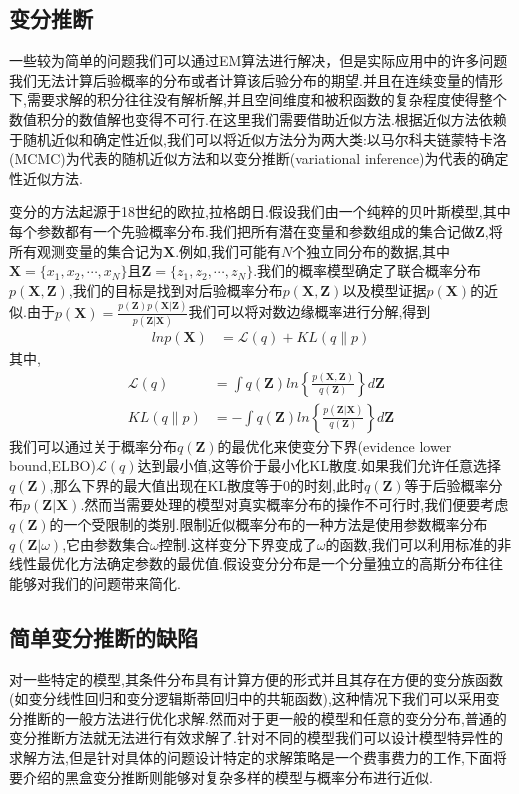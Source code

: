 \documentclass{ctexart}
\begin{document}
\subsection{变分推断}
一些较为简单的问题我们可以通过EM算法进行解决，但是实际应用中的许多问题我们无法计算后验概率的分布或者计算该后验分布的期望.并且在连续变量的情形下,需要求解的积分往往没有解析解,并且空间维度和被积函数的复杂程度使得整个数值积分的数值解也变得不可行.在这里我们需要借助近似方法.根据近似方法依赖于随机近似和确定性近似,我们可以将近似方法分为两大类:以马尔科夫链蒙特卡洛(MCMC)为代表的随机近似方法和以变分推断(variational inference)为代表的确定性近似方法.


变分的方法起源于18世纪的欧拉,拉格朗日.假设我们由一个纯粹的贝叶斯模型,其中每个参数都有一个先验概率分布.我们把所有潜在变量和参数组成的集合记做$\mathbf{Z}$,将所有观测变量的集合记为$\mathbf{X}$.例如,我们可能有$N$个独立同分布的数据,其中$\mathbf{X}=\{x_1,x_2,\cdots,x_N\}$且$\mathbf{Z}=\{z_1,z_2,\cdots,z_N\}$.我们的概率模型确定了联合概率分布$p(\mathbf{X,Z})$,我们的目标是找到对后验概率分布$p(\mathbf{X,Z})$以及模型证据$p(\mathbf{X})$的近似.由于$p(\mathbf{X}) = \frac{p(\mathbf{Z})p(\mathbf{X|Z})}{p(\mathbf{Z|X})}$我们可以将对数边缘概率进行分解,得到
\begin{align*}
lnp(\mathbf{X}) &=\mathcal{L}(q)+KL(q\|p)
\end{align*}
其中,
\begin{align*}
\mathcal{L}(q) &= \int q(\mathbf{Z})ln\left\{\frac{p(\mathbf{X,Z})}{q(\mathbf{Z})}\right\}d\mathbf{Z}\\
KL(q\|p) &= -\int q(\mathbf{Z})ln\left\{\frac{p(\mathbf{Z|X})}{q(\mathbf{Z})}\right\}d\mathbf{Z}
\end{align*}
我们可以通过关于概率分布$q(\mathbf{Z})$的最优化来使变分下界(evidence lower bound,ELBO)$\mathcal{L}(q)$达到最小值,这等价于最小化KL散度.如果我们允许任意选择$q(\mathbf{Z})$,那么下界的最大值出现在KL散度等于0的时刻,此时$q(\mathbf{Z})$等于后验概率分布$p(\mathbf{Z|X})$.然而当需要处理的模型对真实概率分布的操作不可行时,我们便要考虑$q(\mathbf{Z})$的一个受限制的类别.限制近似概率分布的一种方法是使用参数概率分布$q(\mathbf{Z}|\omega)$,它由参数集合$\omega$控制.这样变分下界变成了$\omega$的函数,我们可以利用标准的非线性最优化方法确定参数的最优值.假设变分分布是一个分量独立的高斯分布往往能够对我们的问题带来简化.\cite{bishop2006pattern}
\subsection{简单变分推断的缺陷}
对一些特定的模型,其条件分布具有计算方便的形式并且其存在方便的变分族函数(如变分线性回归和变分逻辑斯蒂回归中的共轭函数),这种情况下我们可以采用变分推断的一般方法进行优化求解.然而对于更一般的模型和任意的变分分布,普通的变分推断方法就无法进行有效求解了.针对不同的模型我们可以设计模型特异性的求解方法,但是针对具体的问题设计特定的求解策略是一个费事费力的工作,下面将要介绍的黑盒变分推断则能够对复杂多样的模型与概率分布进行近似.
\end{document}
